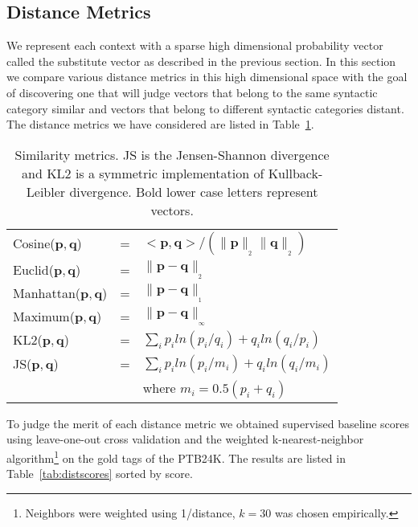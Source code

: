 \subsection{Distance Metrics}
\label{sec:dist}

We represent each context with a sparse high dimensional probability
vector called the substitute vector as described in the previous
section.  In this section we compare various distance metrics in this
high dimensional space with the goal of discovering one that will
judge vectors that belong to the same syntactic category similar and
vectors that belong to different syntactic categories distant.  The
distance metrics we have considered are listed in
Table~\ref{tab:metrics}.


\begin{table}[ht] \centering
\caption{Similarity metrics.  JS is the Jensen-Shannon divergence and
  KL2 is a symmetric implementation of Kullback-Leibler
  divergence. Bold lower case letters represent vectors.}
\begin{tabular}{|lll|}
\hline
Cosine($\mathbf{p}, \mathbf{q}$) & = & $<\mathbf{p},\mathbf{q}> / (\|\mathbf{p}\|_{_{2}} \|\mathbf{q}\|_{_{2}})$ \\
Euclid($\mathbf{p}, \mathbf{q}$) & = & $\|\mathbf{p} - \mathbf{q}\|_{_{2}}$ \\
Manhattan($\mathbf{p}, \mathbf{q}$) & = & $\|\mathbf{p} - \mathbf{q}\|_{_{1}}$ \\
Maximum($\mathbf{p}, \mathbf{q}$) & = & $\|\mathbf{p} - \mathbf{q}\|_{_{\infty}}$ \\
KL2($\mathbf{p}, \mathbf{q}$) & = & $\sum_i p_iln(p_i/q_i) + q_iln(q_i/p_i) $\\
JS($\mathbf{p}, \mathbf{q}$) & = & $\sum_i p_iln(p_i/m_i) + q_iln(q_i/m_i) $\\
& & where $m_i = 0.5(p_i + q_i)$\\
\hline
\end{tabular}
\label{tab:metrics}
\end{table}


To judge the merit of each distance metric we obtained supervised
baseline scores using leave-one-out cross validation and the weighted
k-nearest-neighbor algorithm\footnote{Neighbors were weighted using
  1/distance, $k=30$ was chosen empirically.} on the gold tags of the
PTB24K.  The results are listed in
Table~\ref{tab:distscores} sorted by score.


